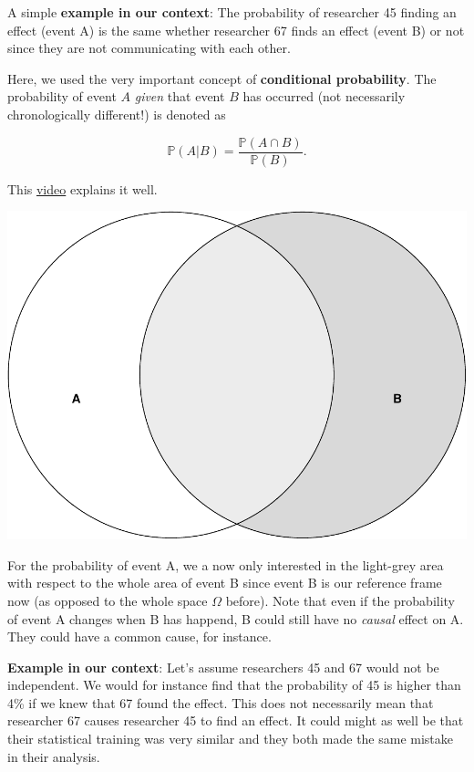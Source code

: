 \documentclass[
]{book}
\newcommand{\pandocbounded}[1]{#1}
\begin{document}
A simple \textbf{example in our context}:
The probability of researcher 45 finding an effect (event A) is the same whether researcher 67 finds an effect (event B) or not since they are not communicating with each other.

Here, we used the very important concept of \textbf{conditional probability}.
The probability of event \(A\) \emph{given} that event \(B\) has occurred (not necessarily chronologically different!) is denoted as

\[\mathbb{P}(A | B) = \frac{\mathbb{P}(A \cap B)}{\mathbb{P}(B)}.\]

This \href{https://www.youtube.com/watch?v=ibINrxJLvlM&ab_channel=Dr.TreforBazett}{video} explains it well.

\pandocbounded{\includegraphics[keepaspectratio]{_main_files/figure-latex/unnamed-chunk-5-1.pdf}}

For the probability of event A, we a now only interested in the light-grey area with respect to the whole area of event B since event B
is our reference frame now (as opposed to the whole space \(\Omega\) before).
Note that even if the probability of event A changes when B has happend, B could still have no \emph{causal} effect on A. They could have a common cause, for instance.

\textbf{Example in our context}:
Let's assume researchers 45 and 67 would not be independent. We would for instance find that the probability of 45 is higher than 4\% if we knew that 67 found the effect.
This does not necessarily mean that researcher 67 causes researcher 45 to find an effect. It could
might as well be that their statistical training was very similar and they both made the same mistake in their analysis.
\end{document}
